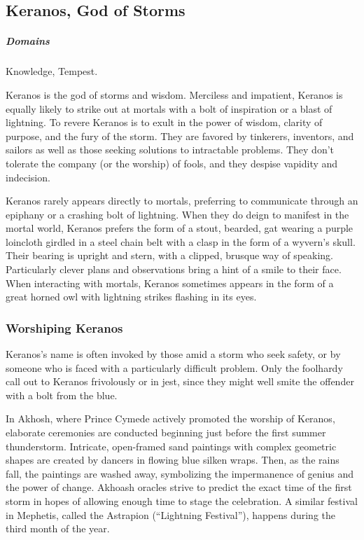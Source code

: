 \subsection*{Keranos, God of Storms} \label{ssec::keranos}
    \subparagraph{Domains} Knowledge, Tempest.

    Keranos is the god of storms and wisdom.
    Merciless and impatient, Keranos is equally likely to strike out at mortals with a bolt of inspiration or a blast of lightning.
    To revere Keranos is to exult in the power of wisdom, clarity of purpose, and the fury of the storm.
    They are favored by tinkerers, inventors, and sailors as well as those seeking solutions to intractable problems.
    They don't tolerate the company (or the worship) of fools, and they despise vapidity and indecision.

    Keranos rarely appears directly to mortals, preferring to communicate through an epiphany or a crashing bolt of lightning.
    When they do deign to manifest in the mortal world, Keranos prefers the form of a stout, bearded, gat wearing a purple loincloth girdled in a steel chain belt with a clasp in the form of a wyvern's skull.
    Their bearing is upright and stern, with a clipped, brusque way of speaking.
    Particularly clever plans and observations bring a hint of a smile to their face.
    When interacting with mortals, Keranos sometimes appears in the form of a great horned owl with lightning strikes flashing in its eyes.

    \subsubsection{Worshiping Keranos}
        Keranos's name is often invoked by those amid a storm who seek safety, or by someone who is faced with a particularly difficult problem.
        Only the foolhardy call out to Keranos frivolously or in jest, since they might well smite the offender with a bolt from the blue.

        In Akhosh, where Prince Cymede actively promoted the worship of Keranos, elaborate ceremonies are conducted beginning just before the first summer thunderstorm.
        Intricate, open-framed sand paintings with complex geometric shapes are created by dancers in flowing blue silken wraps.
        Then, as the rains fall, the paintings are washed away, symbolizing the impermanence of genius and the power of change.
        Akhoash oracles strive to predict the exact time of the first storm in hopes of allowing enough time to stage the celebration.
        A similar festival in Mephetis, called the Astrapion (``Lightning Festival''), happens during the third month of the year.

